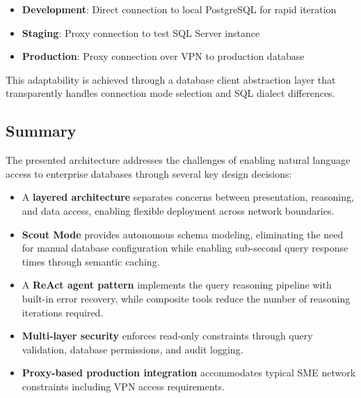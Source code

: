 \begin{itemize}
    \item \textbf{Development}: Direct connection to local PostgreSQL for rapid iteration
    \item \textbf{Staging}: Proxy connection to test SQL Server instance
    \item \textbf{Production}: Proxy connection over VPN to production database
\end{itemize}

This adaptability is achieved through a database client abstraction layer that transparently handles connection mode selection and SQL dialect differences.

\subsection{Summary}
\label{subsec:architecture-summary}

The presented architecture addresses the challenges of enabling natural language access to enterprise databases through several key design decisions:

\begin{itemize}
    \item A \textbf{layered architecture} separates concerns between presentation, reasoning, and data access, enabling flexible deployment across network boundaries.

    \item \textbf{Scout Mode} provides autonomous schema modeling, eliminating the need for manual database configuration while enabling sub-second query response times through semantic caching.

    \item A \textbf{ReAct agent pattern} implements the query reasoning pipeline with built-in error recovery, while composite tools reduce the number of reasoning iterations required.

    \item \textbf{Multi-layer security} enforces read-only constraints through query validation, database permissions, and audit logging.

    \item \textbf{Proxy-based production integration} accommodates typical SME network constraints including VPN access requirements.
\end{itemize}

